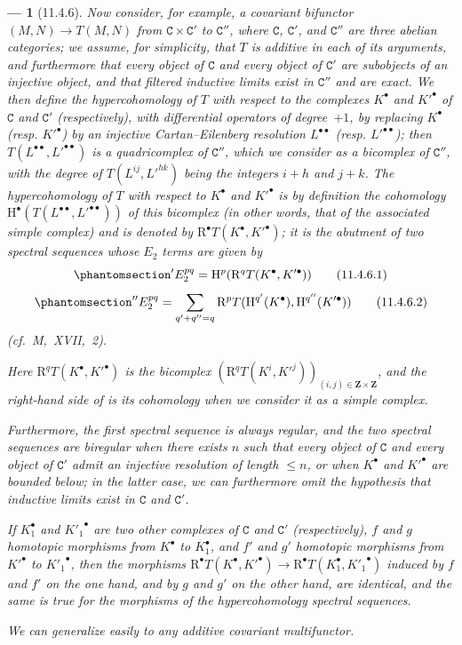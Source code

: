 \documentclass[oneside]{amsart}
\theoremstyle{ega-env-style}
\newtheorem*{env}{---}
\theoremstyle{ega-thm-env-style}
\theoremstyle{ega-defn-env-style}
\def\bb{\mathbf}                    %
\def\cat{\mathtt}                   %
\def\leq{\leqslant}                 %
\def\HH{\mathrm{H}}                 %
\def\RR{\mathrm{R}}                 %
\newcommand{\oldpage}[2][]{{\marginnote{\normalfont{\textbf{#1}~|~#2}}}\ignorespaces}
\let\EGAOriginalLabel\label
\renewcommand{\label}[1]{\phantomsection\EGAOriginalLabel{#1}}
\begin{document}
\begin{env}[11.4.6]
\label{0.11.4.6}
Now consider, for example, a covariant bifunctor $(M, N) \rightarrow T(M, N)$ from $\cat{C} \times \cat{C}'$ to $\cat{C}''$, where $\cat{C}$, $\cat{C}'$, and $\cat{C}''$ are three abelian categories;
we assume, for simplicity, that $T$ is additive in each of its arguments, and furthermore that every object of $\cat{C}$ and every object of $\cat{C}'$ are subobjects of an injective object, 
and that filtered inductive limits exist in $\cat{C}''$ and are exact.
We then define the \emph{hypercohomology} of $T$ with respect to the complexes $K^\bullet$ and $K'^\bullet$ of $\cat{C}$ and $\cat{C}'$ (respectively), with differential operators of degree~$+1$, by replacing $K^\bullet$ (resp. $K'^\bullet$) by an injective Cartan--Eilenberg resolution $L^{\bullet\bullet}$ (resp. $L'^{\bullet\bullet}$);
then $T(L^{\bullet\bullet}, L'^{\bullet\bullet})$ is a quadricomplex of $\cat{C}''$, which we consider as a \emph{bicomplex} of $\cat{C}''$, with the degree of $T(L^{ij}, L'^{hk})$ being the integers $i+h$ and $j+k$.
The \emph{hypercohomology} of $T$ with respect to $K^\bullet$ and $K'^\bullet$ is by definition the cohomology $\HH^\bullet(T(L^{\bullet\bullet}, L'^{\bullet\bullet}))$ of this bicomplex  (in other words, that of the associated simple complex) and is denoted by $\RR^\bullet T(K^\bullet, K'^\bullet)$;
\oldpage[0\textsubscript{III}]{35}
it is the abutment of two spectral sequences whose $E_2$ terms are given by
\[
\label{0.11.4.6.1}
  'E_2^{pq}
  = \HH^p(\RR^q T(K^\bullet, K'^\bullet))
\tag{11.4.6.1}
\]
\[
\label{0.11.4.6.2}
  ''E_2^{pq}
  = \sum_{q'+q''=q}\RR^p T(\HH^{q'}(K^\bullet),\HH^{q''}(K'^\bullet))
\tag{11.4.6.2}
\]
(cf.~M,~XVII,~2).

Here $\RR^q T(K^\bullet, K'^\bullet)$ is the bicomplex $(\RR^q T(K^i, K'^j))_{(i,j)\in \bb{Z}\times \bb{Z}}$, and the right-hand side of  is its cohomology when we consider it as a simple complex.

Furthermore, the first spectral sequence is always regular, and the two spectral sequences are biregular when there exists $n$ such that every object of $\cat{C}$ and every object of $\cat{C}'$ admit an injective resolution of length $\leq n$, or when $K^\bullet$ and $K'^\bullet$ are bounded below;
in the latter case, we can furthermore omit the hypothesis that inductive limits exist in $\cat{C}$ and $\cat{C}'$.

If $K_1^\bullet$ and ${K'_1}^\bullet$ are two other complexes of $\cat{C}$ and $\cat{C}'$ (respectively), $f$ and $g$ \emph{homotopic} morphisms from $K^\bullet$ to $K_1^\bullet$, 
and $f'$ and $g'$ \emph{homotopic} morphisms from $K'^\bullet$ to ${K'_1}^\bullet$, then the morphisms $\RR^\bullet  T(K^\bullet, K'^\bullet) \rightarrow \RR^\bullet  T(K_1^\bullet, {K'_1}^\bullet)$ induced by $f$ and $f'$ on the one hand, and by $g$ and $g'$ on the other hand, are identical, and the same is true for the morphisms of the hypercohomology spectral sequences.

We can generalize easily to any additive covariant multifunctor.
\end{env}
\end{document}

